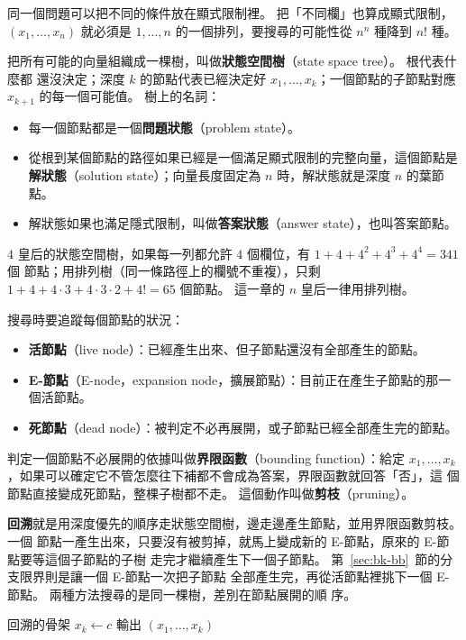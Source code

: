 同一個問題可以把不同的條件放在顯式限制裡。 把「不同欄」也算成顯式限制，$(x_1, \ldots,
x_n)$ 就必須是 $1, \ldots, n$ 的一個排列，要搜尋的可能性從 $n^n$ 種降到 $n!$ 種。

把所有可能的向量組織成一棵樹，叫做\textbf{狀態空間樹}（state space tree）。 根代表什麼都
還沒決定；深度 $k$ 的節點代表已經決定好 $x_1, \ldots, x_k$；一個節點的子節點對應 $x_{k+1}$
的每一個可能值。 樹上的名詞：

\begin{itemize}
\item 每一個節點都是一個\textbf{問題狀態}（problem state）。
\item 從根到某個節點的路徑如果已經是一個滿足顯式限制的完整向量，這個節點是
\textbf{解狀態}（solution state）；向量長度固定為 $n$ 時，解狀態就是深度 $n$ 的葉節點。
\item 解狀態如果也滿足隱式限制，叫做\textbf{答案狀態}（answer state），也叫答案節點。
\end{itemize}

$4$ 皇后的狀態空間樹，如果每一列都允許 $4$ 個欄位，有 $1 + 4 + 4^2 + 4^3 + 4^4 = 341$ 個
節點；用排列樹（同一條路徑上的欄號不重複），只剩 $1 + 4 + 4 \cdot 3 + 4 \cdot 3 \cdot 2 +
4! = 65$ 個節點。 這一章的 $n$ 皇后一律用排列樹。

搜尋時要追蹤每個節點的狀況：

\begin{itemize}
\item \textbf{活節點}（live node）：已經產生出來、但子節點還沒有全部產生的節點。
\item \textbf{E-節點}（E-node，expansion node，擴展節點）：目前正在產生子節點的那一個活節點。
\item \textbf{死節點}（dead node）：被判定不必再展開，或子節點已經全部產生完的節點。
\end{itemize}

判定一個節點不必展開的依據叫做\textbf{界限函數}（bounding function）：給定
$x_1, \ldots, x_k$，如果可以確定它不管怎麼往下補都不會成為答案，界限函數就回答「否」，這
個節點直接變成死節點，整棵子樹都不走。 這個動作叫做\textbf{剪枝}（pruning）。

\textbf{回溯}就是用深度優先的順序走狀態空間樹，邊走邊產生節點，並用界限函數剪枝。 一個
節點一產生出來，只要沒有被剪掉，就馬上變成新的 E-節點，原來的 E-節點要等這個子節點的子樹
走完才繼續產生下一個子節點。 第~\ref{sec:bk-bb}~節的分支限界則是讓一個 E-節點一次把子節點
全部產生完，再從活節點裡挑下一個 E-節點。 兩種方法搜尋的是同一棵樹，差別在節點展開的順
序。

\begin{pseudo}[label=alg:bk-generic, unbreakable]{回溯的骨架}
            \State $x_k \gets c$
                \State 輸出 $(x_1, \ldots, x_k)$
            \EndIf
                \State {}
            \EndIf
        \EndIf
    \EndFor
\EndProcedure
\end{pseudo}


